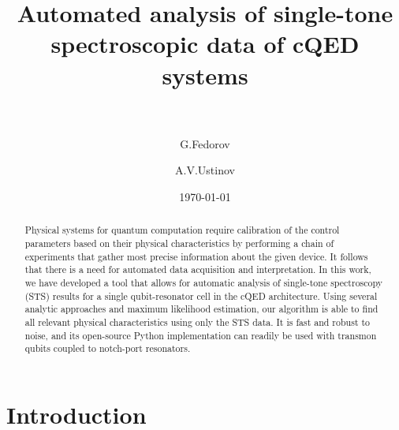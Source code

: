 \documentclass[%
 aip,
 draft,
 amsmath,amssymb,
 reprint,%
]{revtex4-1}
\begin{document}

\title[Automated analysis of single-tone spectroscopic data of cQED systems]{Automated analysis of single-tone spectroscopic data of cQED systems\\~}

\author{G.Fedorov}

%
%
%

\author{A.V.Ustinov}
%
%
%

\date{\today}%

\begin{abstract}
Physical systems for quantum computation require calibration of the control parameters based on their physical characteristics by performing a chain of experiments that gather most precise information about the given device. It follows that there is a need for automated data acquisition and interpretation. In this work, we have developed a tool that allows for automatic analysis of single-tone spectroscopy (STS) results for a single qubit-resonator cell in the cQED architecture. Using several analytic approaches and maximum likelihood estimation, our algorithm is able to find all relevant physical characteristics using only the STS data. It is fast and robust to noise, and its open-source Python implementation can readily be used with transmon qubits coupled to notch-port resonators.
\end{abstract}

\maketitle

 \renewcommand*{\figureautorefname}{Fig.}

\section{Introduction} \label{sec:level1} 
\end{document}
